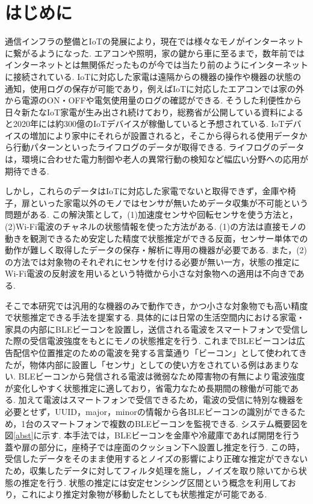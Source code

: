 \documentclass[Japanese]{dicomopapers}
\begin{document}
\section{はじめに}
通信インフラの整備とIoTの発展により，現在では様々なモノがインターネットに繋がるようになった.
エアコンや照明，家の鍵から車に至るまで，数年前ではインターネットとは無関係だったものが今では当たり前のようにインターネットに接続されている.
IoTに対応した家電は遠隔からの機器の操作や機器の状態の通知，使用ログの保存が可能であり，例えばIoTに対応したエアコンでは家の外から電源のON・OFFや電気使用量のログの確認ができる.
そうした利便性から日々新たなIoT家電が生み出され続けており，総務省が公開している資料\cite{soumusyo}によると2020年には約300億のIoTデバイスが稼働していると予想されている.
IoTデバイスの増加により家中にそれらが設置されると，そこから得られる使用データから行動パターンといったライフログのデータが取得できる.
ライフログのデータは，環境に合わせた電力制御や老人の異常行動の検知など幅広い分野への応用が期待できる.

しかし，これらのデータはIoTに対応した家電でないと取得できず，金庫や椅子，扉といった家電以外のモノではセンサが無いためデータ収集が不可能という問題がある.
この解決策として，(1)加速度センサや回転センサを使う方法と，(2)Wi-Fi電波のチャネルの状態情報を使った方法がある.
(1)の方法は直接モノの動きを観測できるため安定した精度で状態推定ができる反面，センサー単体での動作が難しく取得したデータの保存・解析に専用の機器が必要である.
また，(2)の方法では対象物のそれぞれにセンサを付ける必要が無い一方，状態の推定にWi-Fi電波の反射波を用いるという特徴から小さな対象物への適用は不向きである.

そこで本研究では汎用的な機器のみで動作でき，かつ小さな対象物でも高い精度で状態推定できる手法を提案する.
具体的には日常の生活空間内における家電・家具の内部にBLEビーコンを設置し，送信される電波をスマートフォンで受信した際の受信電波強度をもとにモノの状態推定を行う.
これまでBLEビーコンは広告配信や位置推定のための電波を発する言葉通り「ビーコン」として使われてきたが，物体内部に設置し「センサ」としての使い方をされている例はあまりない.
BLEビーコンから発信される電波は微弱なため障害物の有無により電波強度が変化しやすく状態推定に適しており，省電力なため長期間の稼働が可能である.
加えて電波はスマートフォンで受信できるため，電波の受信に特別な機器を必要とせず，UUID，major，minorの情報から各BLEビーコンの識別ができるため，1台のスマートフォンで複数のBLEビーコンを監視できる.
システム概要図を図\ref{abst}に示す.
本手法では，BLEビーコンを金庫や冷蔵庫であれば開閉を行う蓋や扉の部分に，座椅子では座面のクッション下へ設置し推定を行う.
この時，受信したデータをそのまま使用するとノイズの影響により正確な推定ができないため，収集したデータに対してフィルタ処理を施し，ノイズを取り除いてから状態の推定を行う.
状態の推定には安定センシング区間という概念を利用しており，これにより推定対象物が移動したとしても状態推定が可能である.
\end{document}
